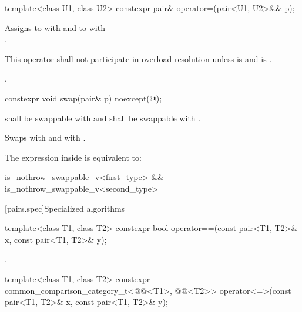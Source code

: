 %
\begin{itemdecl}
template<class U1, class U2> constexpr pair& operator=(pair<U1, U2>&& p);
\end{itemdecl}

\begin{itemdescr}
\pnum
\effects
Assigns to  with 
and to  with\\ .

\pnum
\remarks
This operator shall not participate in overload resolution unless
 is 
and  is .

\pnum
\returns
{}.
\end{itemdescr}

%
\begin{itemdecl}
constexpr void swap(pair& p) noexcept(@\seebelow@);
\end{itemdecl}

\begin{itemdescr}
\pnum
\requires
{} shall be swappable with
 and  shall be swappable with .

\pnum
\effects
Swaps
 with  and
 with .

\pnum
\remarks
The expression inside  is equivalent to:
\begin{codeblock}
is_nothrow_swappable_v<first_type> && is_nothrow_swappable_v<second_type>
\end{codeblock}
\end{itemdescr}

[pairs.spec]{Specialized algorithms}

%
\begin{itemdecl}
template<class T1, class T2>
  constexpr bool operator==(const pair<T1, T2>& x, const pair<T1, T2>& y);
\end{itemdecl}

\begin{itemdescr}
\pnum
\returns
{}.
\end{itemdescr}

%
\begin{itemdecl}
template<class T1, class T2>
  constexpr common_comparison_category_t<@@<T1>,
                                         @@<T2>>
    operator<=>(const pair<T1, T2>& x, const pair<T1, T2>& y);
\end{itemdecl}

